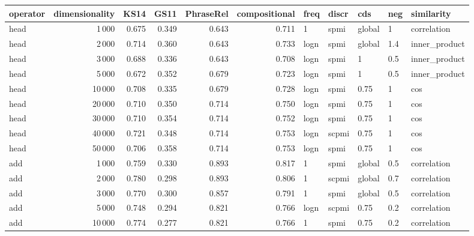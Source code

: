 \begin{tabular}{lrrrrrlllll}
\toprule
operator &  dimensionality &   KS14 &   GS11 &  PhraseRel &  compositional &  freq &  discr &     cds &  neg &     similarity \\
\midrule
    head &            1\,000 &  0.675 &  0.349 &      0.643 &          0.711 &     1 &   spmi &  global &    1 &    correlation \\
    head &            2\,000 &  0.714 &  0.360 &      0.643 &          0.733 &  logn &   spmi &  global &  1.4 &  inner\_product \\
    head &            3\,000 &  0.688 &  0.336 &      0.643 &          0.708 &  logn &   spmi &       1 &  0.5 &  inner\_product \\
    head &            5\,000 &  0.672 &  0.352 &      0.679 &          0.723 &  logn &   spmi &       1 &  0.5 &  inner\_product \\
    head &           10\,000 &  0.708 &  0.335 &      0.679 &          0.728 &  logn &   spmi &    0.75 &    1 &            cos \\
    head &           20\,000 &  0.710 &  0.350 &      0.714 &          0.750 &  logn &   spmi &    0.75 &    1 &            cos \\
    head &           30\,000 &  0.710 &  0.354 &      0.714 &          0.752 &  logn &   spmi &    0.75 &    1 &            cos \\
    head &           40\,000 &  0.721 &  0.348 &      0.714 &          0.753 &  logn &  scpmi &    0.75 &    1 &            cos \\
    head &           50\,000 &  0.706 &  0.358 &      0.714 &          0.753 &  logn &   spmi &    0.75 &    1 &            cos \\
     add &            1\,000 &  0.759 &  0.330 &      0.893 &          0.817 &     1 &   spmi &  global &  0.5 &    correlation \\
     add &            2\,000 &  0.780 &  0.298 &      0.893 &          0.806 &     1 &  scpmi &  global &  0.7 &    correlation \\
     add &            3\,000 &  0.770 &  0.300 &      0.857 &          0.791 &     1 &   spmi &  global &  0.5 &    correlation \\
     add &            5\,000 &  0.748 &  0.294 &      0.821 &          0.766 &  logn &  scpmi &    0.75 &  0.2 &    correlation \\
     add &           10\,000 &  0.774 &  0.277 &      0.821 &          0.766 &     1 &   spmi &    0.75 &  0.2 &    correlation \\

\end{tabular}
